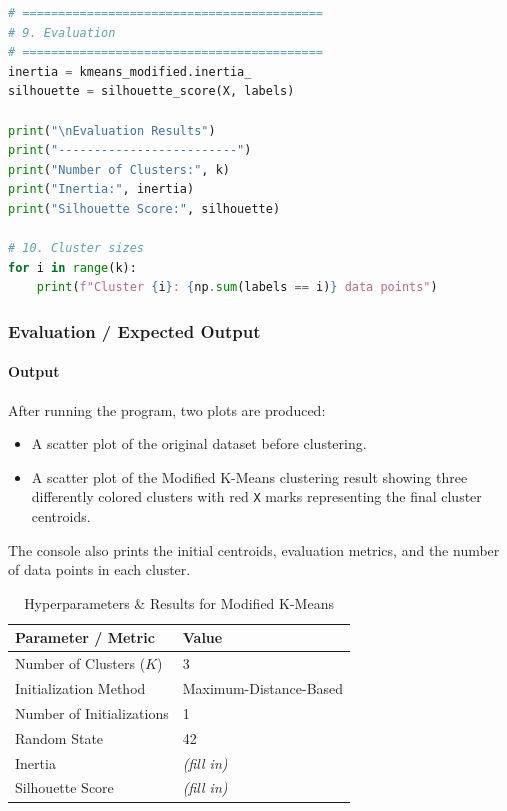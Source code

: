 \documentclass[a4paper,11pt]{article}
\begin{document}
\begin{lstlisting}[language=Python, caption={Modified K-Means Clustering Implementation}]
# ==========================================
# 9. Evaluation
# ==========================================
inertia = kmeans_modified.inertia_
silhouette = silhouette_score(X, labels)

print("\nEvaluation Results")
print("-------------------------")
print("Number of Clusters:", k)
print("Inertia:", inertia)
print("Silhouette Score:", silhouette)

# 10. Cluster sizes
for i in range(k):
    print(f"Cluster {i}: {np.sum(labels == i)} data points")
\end{lstlisting}

\subsubsection{Evaluation / Expected Output}

\paragraph{Output}
After running the program, two plots are produced:
\begin{itemize}
    \item A scatter plot of the original dataset before clustering.
    \item A scatter plot of the Modified K-Means clustering result showing three differently colored clusters with red \texttt{X} marks representing the final cluster centroids.
\end{itemize}
The console also prints the initial centroids, evaluation metrics, and the number of data points in each cluster.

\begin{table}[H]
\centering
\caption{Hyperparameters \& Results for Modified K-Means}
\begin{tabular}{ll}
\toprule
\textbf{Parameter / Metric} & \textbf{Value} \\
\midrule
Number of Clusters ($K$)        & 3 \\
Initialization Method           & Maximum-Distance-Based \\
Number of Initializations       & 1 \\
Random State                    & 42 \\
Inertia                         & \textit{(fill in)} \\
Silhouette Score                & \textit{(fill in)} \\
\bottomrule
\end{tabular}
\end{table}
\end{document}
